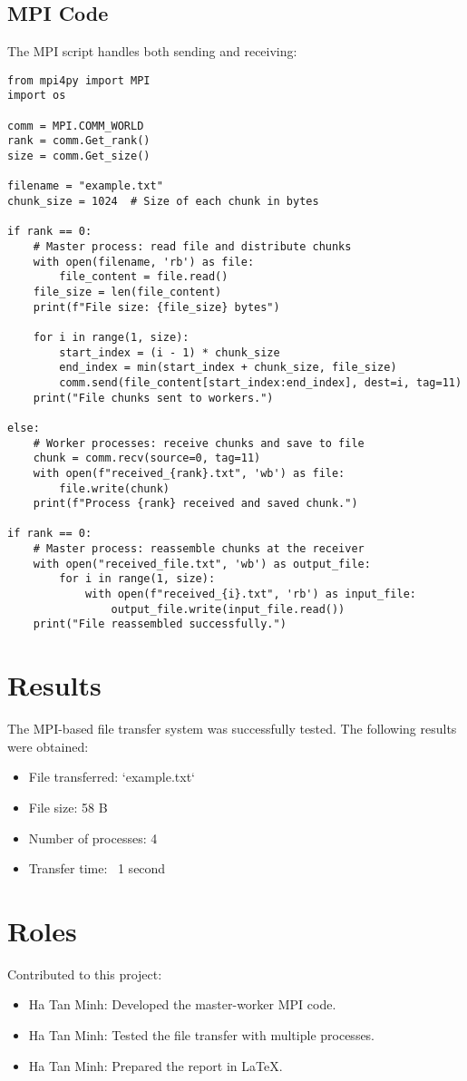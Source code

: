 \documentclass{article}
\begin{document}
\subsection{MPI Code}
The MPI script handles both sending and receiving:
\begin{verbatim}
from mpi4py import MPI
import os

comm = MPI.COMM_WORLD
rank = comm.Get_rank()
size = comm.Get_size()

filename = "example.txt"
chunk_size = 1024  # Size of each chunk in bytes

if rank == 0:
    # Master process: read file and distribute chunks
    with open(filename, 'rb') as file:
        file_content = file.read()
    file_size = len(file_content)
    print(f"File size: {file_size} bytes")

    for i in range(1, size):
        start_index = (i - 1) * chunk_size
        end_index = min(start_index + chunk_size, file_size)
        comm.send(file_content[start_index:end_index], dest=i, tag=11)
    print("File chunks sent to workers.")

else:
    # Worker processes: receive chunks and save to file
    chunk = comm.recv(source=0, tag=11)
    with open(f"received_{rank}.txt", 'wb') as file:
        file.write(chunk)
    print(f"Process {rank} received and saved chunk.")

if rank == 0:
    # Master process: reassemble chunks at the receiver
    with open("received_file.txt", 'wb') as output_file:
        for i in range(1, size):
            with open(f"received_{i}.txt", 'rb') as input_file:
                output_file.write(input_file.read())
    print("File reassembled successfully.")
\end{verbatim}

\section{Results}
The MPI-based file transfer system was successfully tested. The following results were obtained:
\begin{itemize}
    \item File transferred: `example.txt`
    \item File size: 58 B
    \item Number of processes: 4
    \item Transfer time: ~1 second
\end{itemize}

\section{Roles}
Contributed to this project:
\begin{itemize}
    \item Ha Tan Minh: Developed the master-worker MPI code.
    \item Ha Tan Minh: Tested the file transfer with multiple processes.
    \item Ha Tan Minh: Prepared the report in LaTeX.
\end{itemize}
\end{document}
